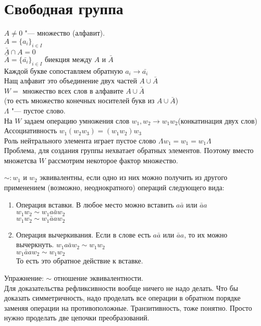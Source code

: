 ﻿\section{Свободная группа}
$A \ne 0$ "--- множество (алфавит).\\
$A = \{a_i\}_{i \in I}$\\
$\bar {A} \cap A = 0$\\
$\bar{A} = \{\bar{a_i}\}_{i \in I}$ биекция между $A$ и $\bar{A}$\\
Каждой букве сопоставляем обратную $a_i \to \bar{a_i}$\\
Нащ алфавит это объединение двух частей $A \cup \bar{A}$\\
$W = $ множество всех слов в алфавите $A \cup \bar{A}$\\
(то есть множество конечных носителей букв из $A \cup \bar{A}$)\\
$\Lambda$ "--- пустое слово. \\
На $W$ задаем операцию умножения слов 
$w_1, w_2 \to w_1w_2$(конкатинация двух слов)\\
Ассоциативность $w_1(w_2w_3) = (w_1w_2)w_3$\\
Роль нейтрального элемента играет пустое слово $\Lambda w_1 = w_1 = w_1 \Lambda$\\

Проблема, для создания группы нехватает обратных элементов. Поэтому вместо множетсва $W$ рассмотрим
некоторое фактор множество.

$\sim \colon w_1$ и $w_2$ эквивалентны, если одно из них можно получить из другого
применением (возможно, неоднократного) операций следующего вида:
\begin{enumerate}
\item Операция вставки. В любое место можно вставить $a\bar{a}$ или $\bar{a}a$\\
$w_1w_2 \sim w_1a\bar{a}w_2$\\
$w_1w_2 \sim w_1\bar{a}aw_2$\\
\item Операция вычеркивания. Если в слове есть $a \bar{a}$ или $\bar{a}a$, то их можно вычеркнуть. 
$w_1a\bar{a}w_2 \sim w_1w_2$\\
$w_1\bar{a}aw_2 \sim w_1w_2$\\
То есть это обратное действие к вставке.
\end{enumerate}

Упражнение: $\sim$ отношение эквивалентности.\\
Для доказательства рефликсивности вообще ничего не надо делать. 
Что бы доказать симметричность, надо проделать все операции в обратном порядке заменяя операции на противоположные. 
Транзитивность, тоже понятно. Просто нужно проделать две цепочки преобразований.

